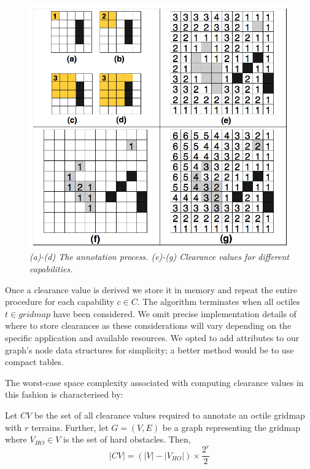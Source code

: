 \begin{figure}[htbp]
       \caption{\emph{(a)-(d) The annotation process. (e)-(g) Clearance values for different capabilities.}}
       \begin{center}
                       \includegraphics[scale=0.25]{diagrams/annotations.png}
       \end{center}
       \label{aha-fig:annotations}
\end{figure}

Once a clearance value is derived we store it in memory and repeat the entire procedure for each capability $c \in C$.  
The algorithm terminates when all octiles $t \in gridmap$ have been considered. 
We omit precise implementation details of where to store clearances as these considerations will vary depending on the specific application and available resources. We opted to add attributes to our graph's node data structures for simplicity; a better method would be to use compact tables.
\par \indent
The worst-case space complexity associated with computing clearance values in this fashion is characterised by: 
\begin{lemma}
\label{aha-lemma:numannotations}
Let $CV$ be the set of all clearance values required to annotate an octile gridmap with $r$ terrains. Further, let $G = (V, E)$ be a graph representing the gridmap where $V_{HO} \in V$ is the set of hard obstacles. Then, 
$$|CV| = (|V| - |V_{HO}|)\times \frac{2^r}{2}$$
\end{lemma}

